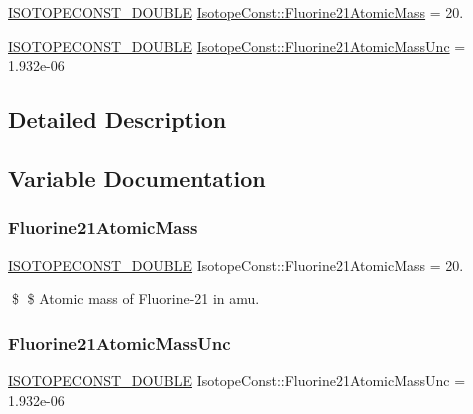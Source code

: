 \begin{DoxyCompactItemize}
\item 
\mbox{\hyperlink{group___isotope_const-_macros_ga8f45a7272ce02c0b4c65c44636ed719a}{I\+S\+O\+T\+O\+P\+E\+C\+O\+N\+S\+T\+\_\+\+D\+O\+U\+B\+LE}} \mbox{\hyperlink{group___isotope_const-_fluorine-_f21_gaf8acd5ffc3d72fa60bffae92dd90b228}{Isotope\+Const\+::\+Fluorine21\+Atomic\+Mass}} = 20.
\item 
\mbox{\hyperlink{group___isotope_const-_macros_ga8f45a7272ce02c0b4c65c44636ed719a}{I\+S\+O\+T\+O\+P\+E\+C\+O\+N\+S\+T\+\_\+\+D\+O\+U\+B\+LE}} \mbox{\hyperlink{group___isotope_const-_fluorine-_f21_gaddfe20c9c1c628275abdadd97be7a25f}{Isotope\+Const\+::\+Fluorine21\+Atomic\+Mass\+Unc}} = 1.\+932e-\/06
\end{DoxyCompactItemize}


\subsection{Detailed Description}


\subsection{Variable Documentation}
\mbox{\label{group___isotope_const-_fluorine-_f21_gaf8acd5ffc3d72fa60bffae92dd90b228}} 
\subsubsection{\texorpdfstring{Fluorine21\+Atomic\+Mass}{Fluorine21AtomicMass}}
{\footnotesize\ttfamily \mbox{\hyperlink{group___isotope_const-_macros_ga8f45a7272ce02c0b4c65c44636ed719a}{I\+S\+O\+T\+O\+P\+E\+C\+O\+N\+S\+T\+\_\+\+D\+O\+U\+B\+LE}} Isotope\+Const\+::\+Fluorine21\+Atomic\+Mass = 20.}

\$ \$ Atomic mass of Fluorine-\/21 in amu. \mbox{\label{group___isotope_const-_fluorine-_f21_gaddfe20c9c1c628275abdadd97be7a25f}} 
\subsubsection{\texorpdfstring{Fluorine21\+Atomic\+Mass\+Unc}{Fluorine21AtomicMassUnc}}
{\footnotesize\ttfamily \mbox{\hyperlink{group___isotope_const-_macros_ga8f45a7272ce02c0b4c65c44636ed719a}{I\+S\+O\+T\+O\+P\+E\+C\+O\+N\+S\+T\+\_\+\+D\+O\+U\+B\+LE}} Isotope\+Const\+::\+Fluorine21\+Atomic\+Mass\+Unc = 1.\+932e-\/06}

